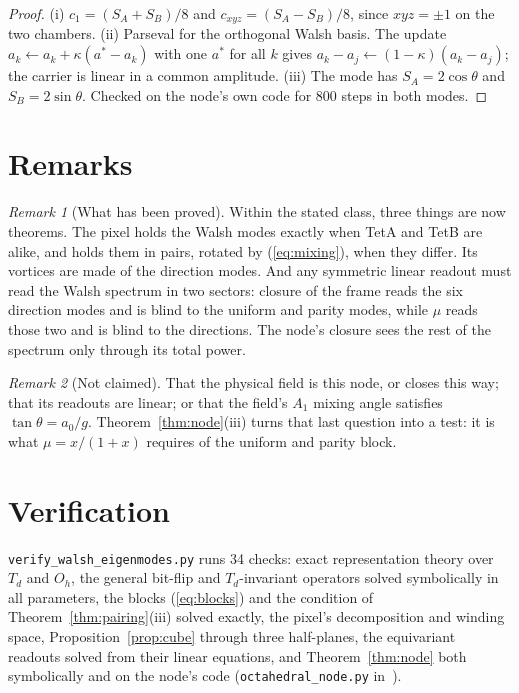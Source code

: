 \documentclass[twocolumn]{iopjournal}
\theoremstyle{definition}
\theoremstyle{remark}
\newtheorem*{remark}{Remark}
\begin{document}
\begin{proof}
(i) $c_1 = (S_A + S_B)/8$ and $c_{xyz} = (S_A - S_B)/8$, since $xyz = \pm1$
on the two chambers. (ii) Parseval for the orthogonal Walsh basis. The
update $a_k \leftarrow a_k + \kappa(a^* - a_k)$ with one $a^*$ for all
$k$ gives $a_k - a_j \leftarrow (1-\kappa)(a_k - a_j)$; the carrier is
linear in a common amplitude. (iii) The mode has $S_A = 2\cos\theta$ and
$S_B = 2\sin\theta$. Checked on the node's own code for 800 steps in both
modes.
\end{proof}


\section{Remarks}

\begin{remark}[What has been proved]
Within the stated class, three things are now theorems. The pixel holds
the Walsh modes exactly when TetA and TetB are alike, and holds them in
pairs, rotated by (\ref{eq:mixing}), when they differ. Its vortices are
made of the direction modes. And any symmetric linear readout must read
the Walsh spectrum in two sectors: closure of the frame reads the six
direction modes and is blind to the uniform and parity modes, while
$\mu$ reads those two and is blind to the directions. The node's closure
sees the rest of the spectrum only through its total power.
\end{remark}

\begin{remark}[Not claimed]
That the physical field is this node, or closes this way; that its
readouts are linear; or that the field's $A_1$ mixing angle satisfies
$\tan\theta = a_0/g$. Theorem~\ref{thm:node}(iii) turns that last
question into a test: it is what $\mu = x/(1+x)$ requires of the uniform
and parity block.
\end{remark}


\section*{Verification}

\texttt{verify\_walsh\_eigenmodes.py} runs 34 checks: exact
representation theory over $T_d$ and $O_h$, the general bit-flip and
$T_d$-invariant operators solved symbolically in all parameters, the
blocks (\ref{eq:blocks}) and the condition of
Theorem~\ref{thm:pairing}(iii) solved exactly, the pixel's
decomposition and winding space, Proposition~\ref{prop:cube} through
three half-planes, the equivariant readouts solved from their linear
equations, and Theorem~\ref{thm:node} both symbolically and on the node's
code (\texttt{octahedral\_node.py} in~\cite{NelsonPixelated}).
\end{document}
